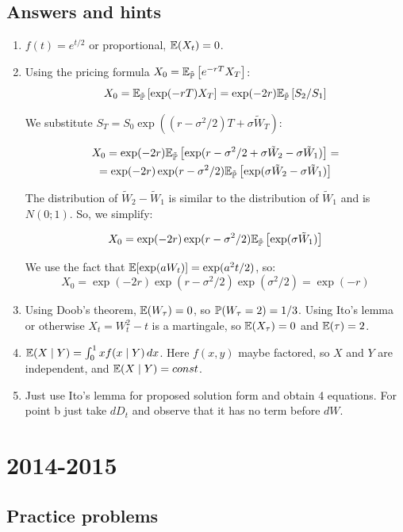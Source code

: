 \documentclass[pdftex,12pt,a4paper]{article}
\begin{document}
\subsection{Answers and hints}

\begin{enumerate}
\item $f(t)=e^{t/2}$ or proportional, $\E(X_t)=0$.
\item Using the pricing formula $X_0=\E_{\tilde{\P}} \left[e^{-rT}X_T \right]$:
\[
X_0=\E_{\tilde{\P}} \left[\exp(-rT)X_T \right]=\exp(-2r)\E_{\tilde{\P}} \left[S_2/S_1 \right]
\]

We substitute $S_T=S_0 \exp((r-\sigma^2/2)T+\sigma \tilde{W}_T)$: 

\begin{multline}
X_0=\exp(-2r)\E_{\tilde{\P}} \left[ \exp(r-\sigma^2/2+\sigma \tilde{W}_2 - \sigma \tilde{W}_1  ) \right] = \\
=\exp(-2r) \exp(r-\sigma^2/2) \E_{\tilde{\P}} \left[  \exp(\sigma \tilde{W}_2 - \sigma \tilde{W}_1  )  \right]
\end{multline}

The distribution of $\tilde{W}_2 - \tilde{W}_1$ is similar to the distribution of $\tilde{W}_1$ and is $N(0;1)$. So, we simplify:

\[
X_0= \exp(-2r) \exp(r-\sigma^2/2) \E_{\tilde{\P}} 
\left[  \exp(\sigma \tilde{W}_1 )  \right]
\]

We use the fact that $\E[\exp(a W_t)]=\exp(a^2 t/ 2)$, so:
\[
X_0=\exp(-2r) \exp(r-\sigma^2/2)  \exp(\sigma^2 / 2)=\exp(-r)
\]

\item Using Doob's theorem, $\E(W_{\tau})=0$, so $\P(W_{\tau}=2)=1/3$. Using Ito's lemma or otherwise $X_t=W_t^2-t$ is a martingale, so $\E(X_{\tau})=0$ and $\E(\tau)=2$.
\item $\E(X \mid Y)= \int_0^1 x f(x \mid Y) \, dx$. Here $f(x,y)$ maybe factored, so $X$ and $Y$ are independent, and $\E(X \mid Y)=const$.
\item Just use Ito's lemma for proposed solution form and obtain 4 equations. For point b just take $dD_t$ and observe that it has no term before $dW$.
\end{enumerate}

\section{2014-2015}

\subsection{Practice problems}
\end{document}
